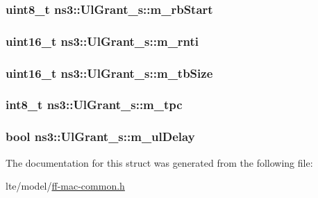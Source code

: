 \subsubsection[{\texorpdfstring{m\+\_\+rb\+Start}{m_rbStart}}]{\setlength{\rightskip}{0pt plus 5cm}uint8\+\_\+t ns3\+::\+Ul\+Grant\+\_\+s\+::m\+\_\+rb\+Start}\hypertarget{structns3_1_1UlGrant__s_ae1c3bca41e76255179dc453af8db97e4}{}\label{structns3_1_1UlGrant__s_ae1c3bca41e76255179dc453af8db97e4}
\subsubsection[{\texorpdfstring{m\+\_\+rnti}{m_rnti}}]{\setlength{\rightskip}{0pt plus 5cm}uint16\+\_\+t ns3\+::\+Ul\+Grant\+\_\+s\+::m\+\_\+rnti}\hypertarget{structns3_1_1UlGrant__s_af84e1341cc3bfe2d93416108b1dce244}{}\label{structns3_1_1UlGrant__s_af84e1341cc3bfe2d93416108b1dce244}
\subsubsection[{\texorpdfstring{m\+\_\+tb\+Size}{m_tbSize}}]{\setlength{\rightskip}{0pt plus 5cm}uint16\+\_\+t ns3\+::\+Ul\+Grant\+\_\+s\+::m\+\_\+tb\+Size}\hypertarget{structns3_1_1UlGrant__s_a650f51e5a4548b11974182c895e4c4e4}{}\label{structns3_1_1UlGrant__s_a650f51e5a4548b11974182c895e4c4e4}
\subsubsection[{\texorpdfstring{m\+\_\+tpc}{m_tpc}}]{\setlength{\rightskip}{0pt plus 5cm}int8\+\_\+t ns3\+::\+Ul\+Grant\+\_\+s\+::m\+\_\+tpc}\hypertarget{structns3_1_1UlGrant__s_a475400b216065aa0e05283ea630d6726}{}\label{structns3_1_1UlGrant__s_a475400b216065aa0e05283ea630d6726}
\subsubsection[{\texorpdfstring{m\+\_\+ul\+Delay}{m_ulDelay}}]{\setlength{\rightskip}{0pt plus 5cm}bool ns3\+::\+Ul\+Grant\+\_\+s\+::m\+\_\+ul\+Delay}\hypertarget{structns3_1_1UlGrant__s_a2eadbde5725c52bfa735763f2d4310fb}{}\label{structns3_1_1UlGrant__s_a2eadbde5725c52bfa735763f2d4310fb}


The documentation for this struct was generated from the following file\+:\begin{DoxyCompactItemize}
\item 
lte/model/\hyperlink{ff-mac-common_8h}{ff-\/mac-\/common.\+h}\end{DoxyCompactItemize}
